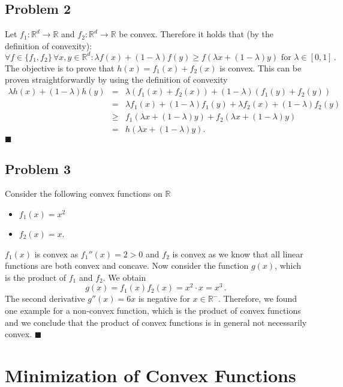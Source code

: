\documentclass{scrartcl}
\newcommand{\qed}{\hfill $\blacksquare$}
\begin{document}
\subsection{Problem 2}
Let $f_1: \mathbb{R}^d \rightarrow \mathbb{R}$ and $f_2: \mathbb{R}^d \rightarrow \mathbb{R}$ be convex. Therefore it holds that (by the definition of convexity):
\begin{equation}
	\forall f \in \{f_1, f_2\} \, \forall x,y\in \mathbb{R}^d: \lambda f(x) + (1- \lambda)f(y) \ge f(\lambda x + (1- \lambda)y) \text { for } \lambda \in [0, 1]\, .
\end{equation}
The objective is to prove that $h(x) = f_1(x) + f_2(x)$ is convex. This can be proven straightforwardly by using the definition of convexity
\begin{eqnarray}
	\lambda h(x) + (1- \lambda)h(y) &=& \lambda(f_1(x) + f_2(x)) + (1- \lambda)(f_1(y) + f_2(y))\\
	&=& \lambda f_1(x) + (1- \lambda)f_1(y) + \lambda f_2(x) + (1- \lambda)f_2(y)\\
	&\ge& f_1(\lambda x + (1- \lambda)y) + f_2(\lambda x + (1- \lambda)y)\\
	&=& h(\lambda x + (1- \lambda)y).
\end{eqnarray} \qed

\subsection{Problem 3}

Consider the following convex functions on $\mathbb{R}$
\begin{itemize}
	\item $f_1(x) = x^2$
	\item $f_2(x) = x$.
\end{itemize}
$f_1(x)$ is convex as $f_1''(x) = 2 > 0$ and $f_2$ is convex as we know that all linear functions are both convex and concave.
Now consider the function $g(x)$, which is the product of $f_1$ and $f_2$. We obtain
\begin{equation}
	g(x) = f_1(x) f_2(x) = x^2 \cdot x = x^3 \, .
\end{equation}
The second derivative $g''(x) = 6x$ is negative for $x \in \mathbb{R}^-$. Therefore, we found one example for a non-convex function, which is the product of convex functions and we conclude that the product of convex functions is in general not necessarily convex. \qed

\section{Minimization of Convex Functions}
\end{document}
